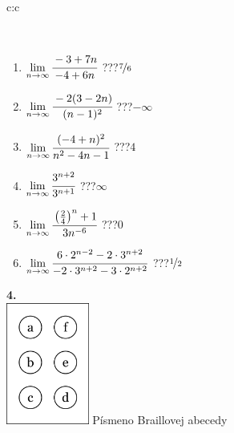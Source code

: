 \documentclass[10pt]{report}
\begin{document}
\begin{tabular}{c:c}
\begin{minipage}[c][104.5mm][t]{0.5\linewidth}
\begin{center}
\begin{minipage}{0.95\linewidth}
\begin{center}
\end{center}
\end{minipage}
\\[1mm]
\begin{minipage}{0.79\linewidth}
\begin{center}
\begin{varwidth}{\linewidth}
\begin{enumerate}
\normalsize
\item $\lim\limits_{n\to\infty}\cfrac{-3+7n}{-4+6n}$\quad \dotfill\; ???\;\dotfill \quad $\nicefrac{7}{6}$
\item $\lim\limits_{n\to\infty}\cfrac{-2(3-2n)}{(n-1)^2}$\quad \dotfill\; ???\;\dotfill \quad $-\infty$
\item $\lim\limits_{n\to\infty}\cfrac{(-4+n)^2}{n^2-4n-1}$\quad \dotfill\; ???\;\dotfill \quad $4$
\item $\lim\limits_{n\to\infty}\cfrac{3^{n+2}}{3^{n+1}}$\quad \dotfill\; ???\;\dotfill \quad $\infty$
\item $\lim\limits_{n\to\infty}\cfrac{\left(\frac{2}{4}\right)^n +1}{3n^{-6}}$\quad \dotfill\; ???\;\dotfill \quad $0$
\item $\lim\limits_{n\to\infty}\cfrac{6\cdot 2^{n-2}-2\cdot 3^{n+2}}{-2\cdot 3^{n+2}-3\cdot 2^{n+2}}$\quad \dotfill\; ???\;\dotfill \quad $\nicefrac{1}{2}$
\end{enumerate}
\end{varwidth}
\end{center}
\end{minipage}
\begin{minipage}{0.20\linewidth}
\begin{center}
{\Huge\bfseries 4.} \\[2mm]
\includegraphics[height=40mm]{../images/braille.png}
{\small Písmeno Braillovej abecedy}
\end{center}
\end{minipage}
\end{center}
\end{minipage}
%
\end{tabular}
\newpage
\thispagestyle{empty}
\end{document}
